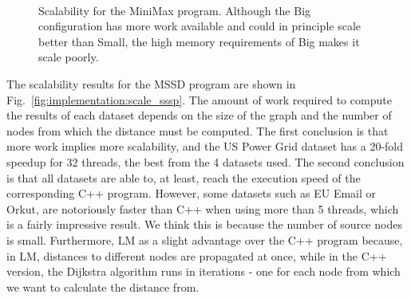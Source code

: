 \begin{figure}[]
\begin{subfigure}[b]{\plotsize\textwidth}
                \label{fig:implementation:scale_minmax_big}
        \end{subfigure}\\

        \caption{Scalability for the MiniMax program. Although the Big
           configuration has more work available and could in principle scale
           better than Small, the high memory requirements of Big makes it scale
           poorly.}

        \label{fig:implementation:scale_minmax}
\end{figure}

The scalability results for the MSSD program are shown in
Fig.~\ref{fig:implementation:scale_sssp}. The amount of work required to compute
the results of each dataset depends on the size of the graph and the number of
nodes from which the distance must be computed. The first conclusion is that
more work implies more scalability, and the US Power Grid dataset has a 20-fold
speedup for 32 threads, the best from the 4 datasets used. The second conclusion
is that all datasets are able to, at least, reach the execution speed of the
corresponding C++ program. However, some datasets such as EU Email or Orkut, are
notoriously faster than C++ when using more than 5 threads, which is a fairly
impressive result.  We think this is because the number of source nodes is
small. Furthermore, LM as a slight advantage over the C++ program because, in
LM, distances to different nodes are propagated at once, while in the C++
version, the Dijkstra algorithm runs in iterations - one for each node from
which we want to calculate the distance from.

